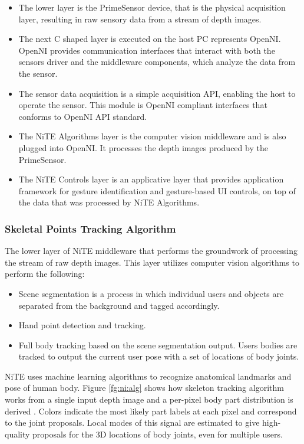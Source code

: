 \begin{itemize}
	\item The lower layer is the PrimeSensor device, that is the physical acquisition layer, resulting in raw sensory data from a stream of depth images. 
	\item The next C shaped layer is executed on the host PC represents OpenNI. OpenNI provides communication interfaces that interact with both the sensors driver and the middleware components, which analyze the data from the sensor. 
	\item The sensor data acquisition is a simple acquisition API, enabling the host to operate the sensor. This module is OpenNI compliant interfaces that conforms to OpenNI API standard. 
	\item The NiTE Algorithms layer is the computer vision middleware and is also plugged into OpenNI. It processes the depth images produced by the PrimeSensor. 
	\item The NiTE Controls layer is an applicative layer that provides application framework for gesture identification and gesture-based UI controls, on top of the data that was processed by NiTE Algorithms. 
\end{itemize}

\subsubsection{Skeletal Points Tracking Algorithm} The lower layer of NiTE middleware that performs the groundwork of processing the stream of raw depth images. This layer utilizes computer vision algorithms to perform the following: 
\begin{itemize}
	\item Scene segmentation is a process in which individual users and objects are separated from the background and tagged accordingly. 
	\item Hand point detection and tracking. 
	\item Full body tracking based on the scene segmentation output. Users bodies are tracked to output the current user pose with a set of locations of body joints. 
\end{itemize}

NiTE uses machine learning algorithms to recognize anatomical landmarks and pose of human body. Figure \ref{fg:ni:alg} shows how skeleton tracking algorithm works from a single input depth image and a per-pixel body part distribution is derived \cite{13}. Colors indicate the most likely part labels at each pixel and correspond to the joint proposals. Local modes of this signal are estimated to give high-quality proposals for the 3D locations of body joints, even for multiple users.

